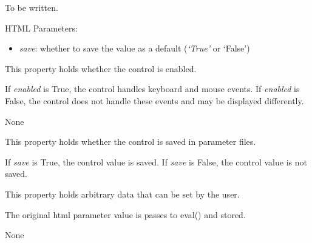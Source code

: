 \documentclass[letterpaper,10pt,english]{sphinxmanual}
\begin{document}
\begin{fulllineitems}
\label{api:qwt.Dial}
To be written.

HTML Parameters:
\begin{itemize}
\item {} 
\emph{save}: whether to save the value as a default (\emph{`True'} or `False')

\end{itemize}

\begin{fulllineitems}
\label{api:qwt.Dial.enabled}
This property holds whether the control is enabled.

If \emph{enabled} is True, the control handles keyboard and mouse events.
If \emph{enabled} is False, the control does not handle these events and may
be displayed differently.

\end{fulllineitems}


\begin{fulllineitems}
\label{api:qwt.Dial.range}
None

\end{fulllineitems}


\begin{fulllineitems}
\label{api:qwt.Dial.save}
This property holds whether the control is saved in parameter files.

If \emph{save} is True, the control value is saved.
If \emph{save} is False, the control value is not saved.

\end{fulllineitems}


\begin{fulllineitems}
\label{api:qwt.Dial.user}
This property holds arbitrary data that can be set by the user.

The original html parameter value is passes to eval() and stored.

\end{fulllineitems}


\begin{fulllineitems}
\label{api:qwt.Dial.value}
None

\end{fulllineitems}


\end{fulllineitems}
\end{document}
